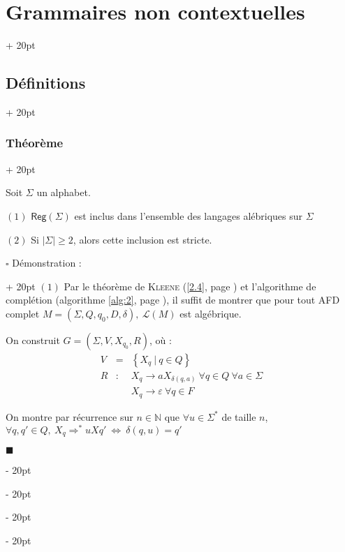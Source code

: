 \documentclass[a4paper, 12pt, twoside]{article}
\newcommand{\N}{\mathbb{N}} %
\newcommand{\lr}[1]{\left( #1 \right)}
\newcommand{\set}[1]{\left\{ #1 \right\}}
\newcommand{\abs}[1]{\left\lvert #1 \right\rvert}
\newcommand{\ssi}{\ \Leftrightarrow \ }
\renewcommand{\ge}{\geqslant}
\newcommand{\ind}[1][20pt]{\advance\leftskip + #1}
\newcommand{\deind}[1][20pt]{\advance\leftskip - #1}
\newenvironment{indt}[2][20pt]{#2 \par \ind[#1]}{\par \deind} %
\newenvironment{proof}[1][{Démonstration :}]{\begin{indt}{$\square$ #1}}{$\blacksquare$ \end{indt}}
\newcommand{\Reg}{\mathsf{Reg}}
\begin{document}
\begin{indt}{\section{Grammaires non contextuelles}}
\begin{indt}{\subsection{Définitions}}
            \vspace{12pt}
            
            \begin{indt}{\subsubsection{Théorème}}
                \begin{emphBox}
                    Soit $\Sigma$ un alphabet.
                    
                    $(1)$ $\Reg(\Sigma)$ est inclus dans l'ensemble des langages alébriques sur $\Sigma$
                    
                    $(2)$ Si $\abs \Sigma \ge 2$, alors cette inclusion est stricte.
                \end{emphBox}

                \vspace{6pt}
                
                \begin{proof}
                    $(1)$ Par le théorème de \textsc{Kleene} (\ref{2.4}, page \pageref{2.4}) et l'algorithme de complétion (algorithme \ref{alg:2}, page \pageref{alg:2}), il suffit de montrer que pour tout AFD complet $M = \lr{\Sigma, Q, q_0, D, \delta},\ \mathcal L(M)$ est algébrique.

                    On construit $G = \lr{\Sigma, V, X_{q_0}, R}$, où :
                    \[
                        \begin{array}{rcl}
                            V &=& \set{X_q\ |\ q \in Q}
                            \\
                            R &:& X_q \rightarrow aX_{\delta(q, a)} \ \forall q \in Q\ \forall a \in \Sigma
                            \\
                              && X_q \rightarrow \varepsilon\ \forall q \in F
                        \end{array}
                    \]

                    On montre par récurrence sur $n \in \N$ que $\forall u \in \Sigma^*$ de taille $n$, $\forall q, q' \in Q,\ X_q \Rightarrow^* uXq' \ssi \delta(q, u) = q'$

                    \vspace{6pt}
                    

\end{proof}
\end{indt}
\end{indt}
\end{indt}
\end{document}
